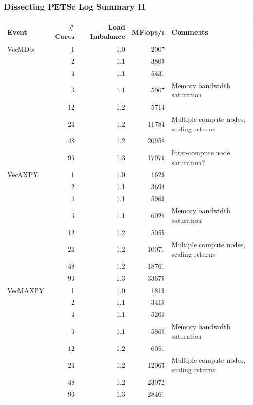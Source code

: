 \documentclass{beamer}
\begin{document}
\begin{frame}
  \frametitle{Dissecting PETSc Log Summary II}

  \begin{center}
{\tiny
\begin{tabular}{lrrrl}
  \hline
  Event & \# Cores & Load Imbalance & MFlops/s & Comments \\
  \hline
VecMDot &    1 & 1.0 &   2007 \\
     &    2 & 1.1 &   3809 \\
     &    4 & 1.1 &   5431 \\
     &    6 & 1.1 &   5967 & Memory bandwidth saturation \\
     &   12 & 1.2 &   5714 \\
     &   24 & 1.2 &  11784 & Multiple compute nodes, scaling returns \\
     &   48 & 1.2 &  20958 \\
     &   96 & 1.3 &  17976 & Inter-compute node saturation? \\
  \hline
VecAXPY &    1 & 1.0 &   1629 \\
     &    2 & 1.1 &   3694 \\
     &    4 & 1.1 &   5969 \\
     &    6 & 1.1 &   6028 & Memory bandwidth saturation \\
     &   12 & 1.2 &   5055 \\
     &   24 & 1.2 &  10071 & Multiple compute nodes, scaling returns \\
     &   48 & 1.2 &  18761 \\
     &   96 & 1.3 &  33676 \\
  \hline
VecMAXPY &    1 & 1.0 &   1819 \\
     &    2 & 1.1 &   3415 \\
     &    4 & 1.1 &   5200 \\
     &    6 & 1.1 &   5860 & Memory bandwidth saturation \\
     &   12 & 1.2 &   6051 \\
     &   24 & 1.2 &  12063 & Multiple compute nodes, scaling returns\\
     &   48 & 1.2 &  23072 \\
     &   96 & 1.3 &  28461 \\
  \hline
\end{tabular}}
\end{center}

\end{frame}
\end{document}
